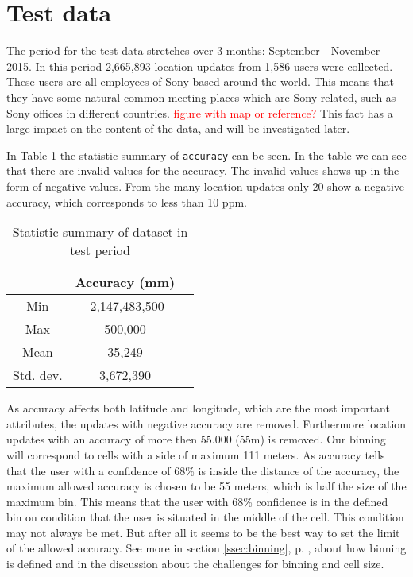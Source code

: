 \section{Test data}
The period for the test data stretches over 3 months: September - November 2015.   
In this period 2,665,893 location updates from 1,586 users were collected. These users are all employees of Sony based around the world. This means that they have some natural common meeting places which are Sony related, such as Sony offices in different countries. \textcolor{red}{figure with map or reference?}
This fact has a large impact on the content of the data, and will be investigated later. 


In Table \ref{tab:stat_geo_p1} the statistic summary of \texttt{accuracy} can be seen. 
In the table we can see that there are invalid values for the accuracy. The invalid values shows up in the form of negative values. 
From the many location updates only 20 show a negative accuracy, which corresponds to less than 10 ppm.  


\begin{table}[H]
        \centering
        \small
        \setlength\tabcolsep{2pt}
        \begin{tabular}{|c|c|c|}
            \hline
                         & Accuracy (mm)          \\[0pt]
            \hline
                 Min     &  -2,147,483,500             \\
            \hline
                 Max     &  500,000                \\
            \hline
                 Mean    & 35,249                      \\
            \hline
                Std. dev.   & 3,672,390                \\
            \hline
        \end{tabular}
        \caption{Statistic summary of dataset in test period}
        \label{tab:stat_geo_p1}
\end{table}

As accuracy affects both latitude and longitude, which are the most important attributes, the updates with negative accuracy are removed. Furthermore location updates with an accuracy of more then 55.000 (55m) is removed. Our binning will correspond to cells with a side of maximum 111 meters. As accuracy tells that the user with a confidence of 68\% is inside the distance of the accuracy, the maximum allowed accuracy is chosen to be 55 meters, which is half the size of the maximum bin. This means that the user with 68\% confidence is in the defined bin on condition that the user is situated in the middle of the cell. This condition may not always be met. But after all it seems to be the best way to set the limit of the allowed accuracy. 
See more in section \ref{ssec:binning}, p. \pageref{ssec:binning}, about how binning is defined and in the discussion about the challenges for binning and cell size. 


